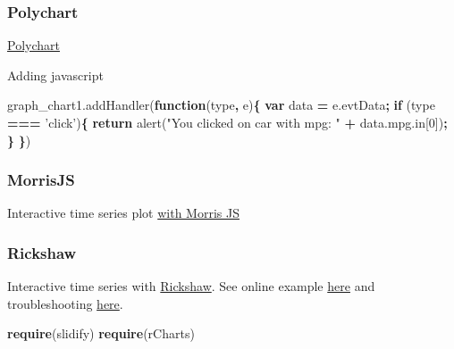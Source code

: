 \documentclass[10,portrait]{article}
\newenvironment{Shaded}{\begin{snugshade}}{\end{snugshade}}
\newcommand{\KeywordTok}[1]{\textcolor[rgb]{0.13,0.29,0.53}{\textbf{#1}}}
\newcommand{\DecValTok}[1]{\textcolor[rgb]{0.00,0.00,0.81}{#1}}
\newcommand{\StringTok}[1]{\textcolor[rgb]{0.31,0.60,0.02}{#1}}
\newcommand{\VariableTok}[1]{\textcolor[rgb]{0.00,0.00,0.00}{#1}}
\newcommand{\ControlFlowTok}[1]{\textcolor[rgb]{0.13,0.29,0.53}{\textbf{#1}}}
\newcommand{\OperatorTok}[1]{\textcolor[rgb]{0.81,0.36,0.00}{\textbf{#1}}}
\newcommand{\AttributeTok}[1]{\textcolor[rgb]{0.77,0.63,0.00}{#1}}
\newcommand{\NormalTok}[1]{#1}
\begin{document}
\subsubsection{Polychart}\label{polychart}

\href{https://github.com/Polychart/polychart2}{Polychart}

Adding javascript

\begin{Shaded}
\begin{Highlighting}[]
\VariableTok{graph_chart1}\NormalTok{.}\AttributeTok{addHandler}\NormalTok{(}\KeywordTok{function}\NormalTok{(type}\OperatorTok{,}\NormalTok{ e)}\OperatorTok{\{}
  \KeywordTok{var}\NormalTok{ data }\OperatorTok{=} \VariableTok{e}\NormalTok{.}\AttributeTok{evtData}\OperatorTok{;}
  \ControlFlowTok{if}\NormalTok{ (type }\OperatorTok{===} \StringTok{'click'}\NormalTok{)}\OperatorTok{\{}
    \ControlFlowTok{return} \AttributeTok{alert}\NormalTok{(}\StringTok{"You clicked on car with mpg: "} \OperatorTok{+} \VariableTok{data}\NormalTok{.}\VariableTok{mpg}\NormalTok{.}\AttributeTok{in}\NormalTok{[}\DecValTok{0}\NormalTok{])}\OperatorTok{;}
  \OperatorTok{\}}
\OperatorTok{\}}\NormalTok{)}
\end{Highlighting}
\end{Shaded}

\subsubsection{MorrisJS}\label{morrisjs}

Interactive time series plot
\href{https://github.com/oesmith/morris.js}{with Morris JS}

\subsubsection{Rickshaw}\label{rickshaw}

Interactive time series with
\href{http://rpubs.com/Koba/80208}{Rickshaw}. See online example
\href{http://timelyportfolio.github.io/rCharts_rickshaw_gettingstarted/}{here}
and troubleshooting \href{http://rpubs.com/Koba/80208}{here}.

\begin{Shaded}
\begin{Highlighting}[]
\KeywordTok{require}\NormalTok{(slidify)}
\KeywordTok{require}\NormalTok{(rCharts)}
\end{Highlighting}
\end{Shaded}
\end{document}
